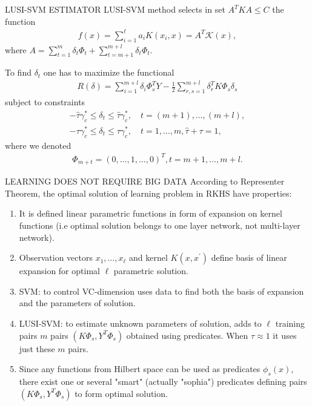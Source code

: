 \documentclass[11pt]{beamer}
\begin{document}
\begin{frame}{LUSI-SVM ESTIMATOR}
LUSI-SVM method selects in set $A^{T}KA \leq C$ the function
\begin{align*}
f(x) = \sum_{i=1}^{\ell}a_{i}K(x_{i}, x) = A^{T}\mathcal{K}(x),
\end{align*}
where $A = \sum_{t=1}^{m}\delta_{t}\Phi_{t} + \sum_{t=m+1}^{m+l}\delta_{t}\Phi_{t}$.

To find $\delta_{t}$ one has to maximize the functional
\begin{align*}
R(\delta) = \sum_{i=1}^{m+l}\delta_{i}\Phi_{s}^{T}Y - \frac{1}{2}\sum_{r,s=1}^{m+l}\delta_{r}^{T}K\Phi_{s}\delta_{s}
\end{align*}
subject to constraints
\begin{align*}
-\hat{\tau}\gamma_{c}^{*} \leq \delta_{t} \leq \hat{\tau}\gamma_{c}^{*}, \quad t = (m+1), \ldots, (m+l),\\
-\tau\gamma_{c}^{*} \leq \delta_{t} \leq \tau\gamma_{c}^{*}, \quad t = 1, \ldots, m, \hat{\tau} + \tau = 1,
\end{align*}
where we denoted
\begin{align*}
\Phi_{m+t} = (0, \ldots, 1, \ldots, 0)^{T}, t = m+1, \ldots, m+l.
\end{align*}
\end{frame}

\begin{frame}{LEARNING DOES NOT REQUIRE BIG DATA}
According to Representer Theorem, the optimal solution of learning problem in RKHS have properties:
\begin{enumerate}
\item It is defined linear parametric functions in form of expansion on kernel functions (i.e optimal solution belongs to one layer network, not multi-layer network).
\item Observation vectors $x_{1},\ldots,x_{\ell}$ and kernel $K(x,x^{\prime})$ define basis of linear expansion for optimal $\ell$ parametric solution.
\item SVM: to control VC-dimension uses data to find both the basis of expansion and the parameters of solution.
\item LUSI-SVM: to estimate unknown parameters of solution, adds to $\ell$ training pairs $m$ pairs $(K\Phi_{s}, Y^{T}\Phi_{s})$ obtained using predicates. When $\tau \approx 1$ it uses just these $m$ pairs.
\item Since any functions from Hilbert space can be used as predicates $\phi_{s}(x)$, there exist one or several "smart" (actually "sophia") predicates defining pairs $(K\Phi_{s}, Y^{T}\Phi_{s})$ to form optimal solution.
\end{enumerate}
\end{frame}
\end{document}
